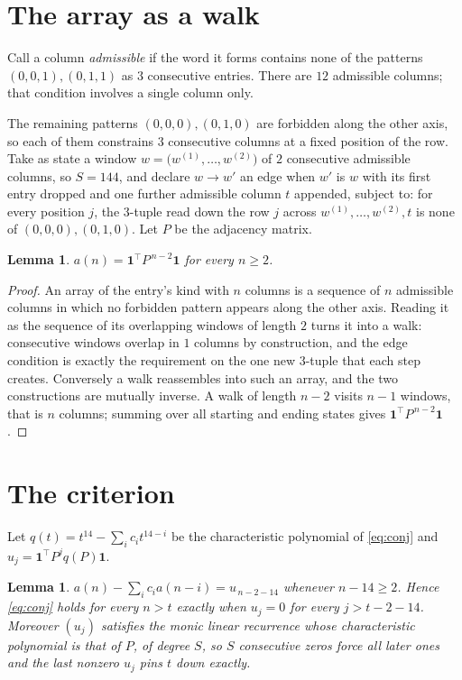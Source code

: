 \documentclass[11pt,a4paper]{article}
\theoremstyle{plain}
\newtheorem{lemma}[theorem]{Lemma}
\theoremstyle{definition}
\begin{document}
\section{The array as a walk}

Call a column \emph{admissible} if the word it forms contains none of the patterns
$(0,0,1), (0,1,1)$ as $3$ consecutive entries. There are $12$ admissible columns; that condition
involves a single column only.

The remaining patterns $(0,0,0), (0,1,0)$ are forbidden along the other axis, so each of them
constrains $3$ consecutive columns at a fixed position of the row. Take as state a
window $w=\bigl(w^{(1)},\dots,w^{(2)}\bigr)$ of $2$ consecutive admissible
columns, so $S=144$, and declare $w\to w'$ an edge when $w'$ is $w$ with its first entry
dropped and one further admissible column $t$ appended, subject to: for every position
$j$, the $3$-tuple read down the row $j$ across $w^{(1)},\dots,w^{(2)},t$
is none of $(0,0,0), (0,1,0)$. Let $P$ be the adjacency matrix.

\begin{lemma}\label{lem:walk}
$a(n)=\mathbf{1}^{\!\top}P^{\,n-2}\mathbf{1}$ for every $n\ge2$.
\end{lemma}

\begin{proof}
An array of the entry's kind with $n$ columns is a sequence of $n$ admissible columns in
which no forbidden pattern appears along the other axis. Reading it as the sequence of its
overlapping windows of length $2$ turns it into a walk: consecutive windows overlap in
$1$ columns by construction, and the edge condition is exactly the requirement on the one
new $3$-tuple that each step creates. Conversely a walk reassembles into such an array,
and the two constructions are mutually inverse. A walk of length $n-2$ visits $n-1$
windows, that is $n$ columns; summing over all starting and ending states gives
$\mathbf{1}^{\!\top}P^{\,n-2}\mathbf{1}$.
\end{proof}

\section{The criterion}

Let $q(t)=t^{14}-\sum_i c_i t^{14-i}$ be the characteristic polynomial of
\eqref{eq:conj} and $u_j=\mathbf{1}^{\!\top}P^{j}q(P)\mathbf{1}$.

\begin{lemma}\label{lem:crit}
$a(n)-\sum_i c_i a(n-i)=u_{\,n-2-14}$ whenever $n-14\ge2$. Hence
\eqref{eq:conj} holds for every $n>t$ exactly when $u_j=0$ for every
$j>t-2-14$. Moreover $(u_j)$ satisfies the monic linear recurrence whose
characteristic polynomial is that of $P$, of degree $S$, so $S$ consecutive zeros force all
later ones and the last nonzero $u_j$ pins $t$ down exactly.
\end{lemma}
\end{document}
